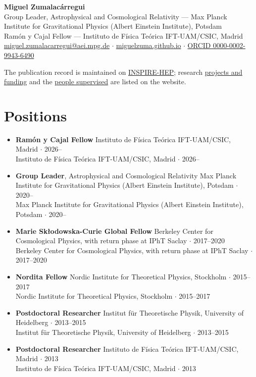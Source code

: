 \documentclass[11pt,a4paper]{article}
\newcommand{\entry}[2]{%
  \item {#1}%
  \ifx\relax#2\relax\else\\[0.1em]{\small\color{soft}#2}\fi
}
\newenvironment{entries}
  {\begin{itemize}[leftmargin=1.1em,itemsep=0.32em,parsep=0pt,topsep=0.3em]}
  {\end{itemize}}
\begin{document}
\begin{center}
  {\LARGE\bfseries Miguel Zumalacárregui}\\[0.45em]
  {\color{soft}Group Leader, Astrophysical and Cosmological Relativity ---
   Max Planck Institute for Gravitational Physics (Albert Einstein Institute), Potsdam}\\[0.2em]
  {\color{soft}Ramón y Cajal Fellow --- Instituto de Física Teórica IFT-UAM/CSIC, Madrid}\\[0.5em]
  {\small
   \href{mailto:miguel.zumalacarregui@aei.mpg.de}{miguel.zumalacarregui@aei.mpg.de}
   \quad$\cdot$\quad
   \href{https://miguelzuma.github.io}{miguelzuma.github.io}
   \quad$\cdot$\quad
   \href{https://orcid.org/0000-0002-9943-6490}{ORCID 0000-0002-9943-6490}}
\end{center}

\vspace{0.2em}
{\small\color{soft}
The publication record is maintained on
\href{https://inspirehep.net/authors/1113379}{INSPIRE-HEP}; research
\href{https://miguelzuma.github.io/projects.html}{projects and funding} and the
\href{https://miguelzuma.github.io/group.html}{people supervised} are listed on the website.}

\section{Positions}
\begin{entries}
  \entry{\textbf{Ramón y Cajal Fellow}}
        {Instituto de Física Teórica IFT-UAM/CSIC, Madrid $\cdot$ 2026--}
  \entry{\textbf{Group Leader}, Astrophysical and Cosmological Relativity}
        {Max Planck Institute for Gravitational Physics (Albert Einstein Institute), Potsdam $\cdot$ 2020--}
  \entry{\textbf{Marie Skłodowska-Curie Global Fellow}}
        {Berkeley Center for Cosmological Physics, with return phase at IPhT Saclay $\cdot$ 2017--2020}
  \entry{\textbf{Nordita Fellow}}
        {Nordic Institute for Theoretical Physics, Stockholm $\cdot$ 2015--2017}
  \entry{\textbf{Postdoctoral Researcher}}
        {Institut für Theoretische Physik, University of Heidelberg $\cdot$ 2013--2015}
  \entry{\textbf{Postdoctoral Researcher}}
        {Instituto de Física Teórica IFT-UAM/CSIC, Madrid $\cdot$ 2013}
\end{entries}

\end{document}

